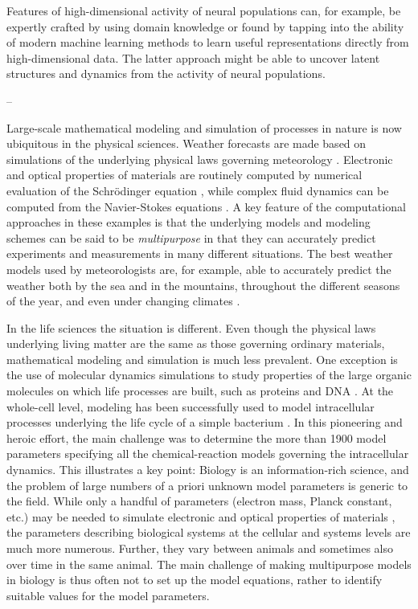 Features of high-dimensional activity of neural populations can, for example, be expertly crafted by using domain knowledge or found by tapping into the ability of modern machine learning methods to learn useful representations directly from high-dimensional data. The latter approach might be able to uncover latent structures and dynamics from the activity of neural populations.

--

Large-scale mathematical modeling and simulation of processes in nature is now ubiquitous in the physical sciences. Weather forecasts are made based on simulations of the underlying physical laws governing meteorology \cite{Bauer_2015}. Electronic and optical properties of materials are routinely computed by numerical evaluation of the Schrödinger equation \cite{Giustino_2014}, while complex fluid dynamics can be computed from the Navier-Stokes equations \cite{Tu_2007}. A key feature of the computational approaches in these examples is that the underlying models and modeling schemes can be said to be \textit{multipurpose} in that they can accurately predict experiments and measurements in many different situations. The best weather models used by meteorologists are, for example, able to accurately predict the weather both by the sea and in the mountains, throughout the different seasons of the year, and even under changing climates \cite{Bauer_2015}.

In the life sciences the situation is different. Even though the physical laws underlying living matter are the same as those governing ordinary materials, mathematical modeling and simulation is much less prevalent. One exception is the use of molecular dynamics simulations to study properties of the large organic molecules on which life processes are built, such as proteins and DNA \cite{Hollingsworth_2018}. At the whole-cell level, modeling has been successfully used to model intracellular processes underlying the life cycle of a simple bacterium \cite{Karr_2012, Covert_2017}. In this pioneering and heroic effort, the main challenge was to determine the more than 1900 model parameters specifying all the chemical-reaction models governing the intracellular dynamics. This illustrates a key point: Biology is an information-rich science, and the problem of large numbers of a priori unknown model parameters is generic to the field. While only a handful of parameters (electron mass, Planck constant, etc.) may be needed to simulate electronic and optical properties of materials \cite{Giustino_2014}, the parameters describing biological systems at the cellular and systems levels are much more numerous. Further, they vary between animals and sometimes also over time in the same animal. The main challenge of making multipurpose models in biology is thus often not to set up the model equations, rather to identify suitable values for the model parameters.


